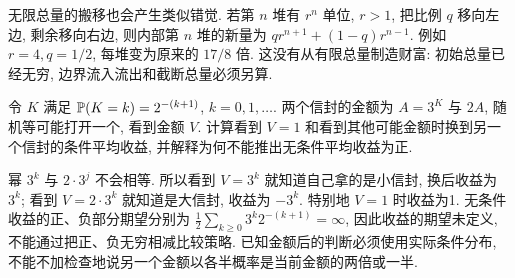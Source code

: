 无限总量的搬移也会产生类似错觉. 若第 $n$ 堆有 $r^n$ 单位, $r>1$, 把比例 $q$ 移向左边, 剩余移向右边, 则内部第 $n$ 堆的新量为 $q r^{n+1}+(1-q)r^{n-1}$. 例如 $r=4,q=1/2$, 每堆变为原来的 $17/8$ 倍. 这没有从有限总量制造财富: 初始总量已经无穷, 边界流入流出和截断总量必须另算.
\begin{exercise}
令 $K$ 满足 $\mathbb P(K=k)=2^{-(k+1)}$, $k=0,1,\ldots$. 两个信封的金额为 $A=3^K$ 与 $2A$, 随机等可能打开一个, 看到金额 $V$. 计算看到 $V=1$ 和看到其他可能金额时换到另一个信封的条件平均收益, 并解释为何不能推出无条件平均收益为正.
\end{exercise}
\begin{solution}
幂 $3^k$ 与 $2\cdot3^j$ 不会相等. 所以看到 $V=3^k$ 就知道自己拿的是小信封, 换后收益为 $3^k$; 看到 $V=2\cdot3^k$ 就知道是大信封, 收益为 $-3^k$. 特别地 $V=1$ 时收益为1. 无条件收益的正、负部分期望分别为
$\frac12\sum_{k\ge0}3^k2^{-(k+1)}=\infty$, 因此收益的期望未定义, 不能通过把正、负无穷相减比较策略. 已知金额后的判断必须使用实际条件分布, 不能不加检查地说另一个金额以各半概率是当前金额的两倍或一半.
\end{solution}
